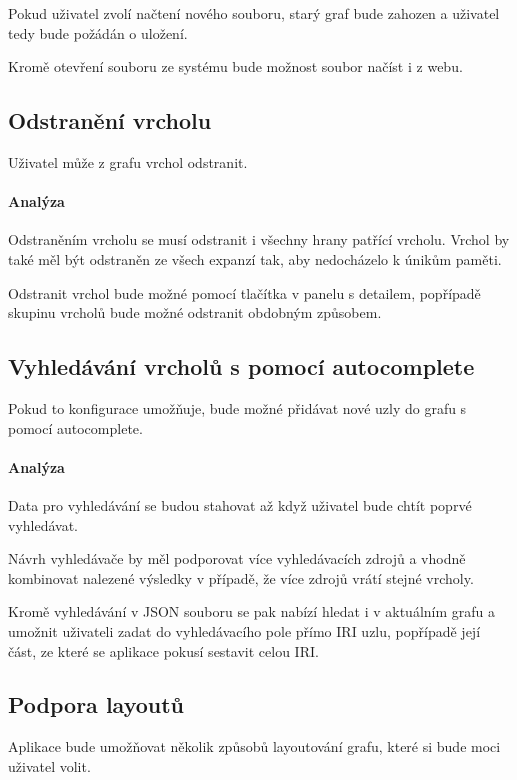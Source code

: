 Pokud uživatel zvolí načtení nového souboru, starý graf bude zahozen a uživatel tedy bude požádán o uložení.

Kromě otevření souboru ze systému bude možnost soubor načíst i z webu.

\subsection*{Odstranění vrcholu}
Uživatel může z grafu vrchol odstranit.

\paragraph{Analýza} Odstraněním vrcholu se musí odstranit i všechny hrany patřící vrcholu. Vrchol by také měl být odstraněn ze všech expanzí tak, aby nedocházelo k únikům paměti.

Odstranit vrchol bude možné pomocí tlačítka v panelu s detailem, popřípadě skupinu vrcholů bude možné odstranit obdobným způsobem.

\subsection*{Vyhledávání vrcholů s pomocí autocomplete}
Pokud to konfigurace umožňuje, bude možné přidávat nové uzly do grafu s pomocí autocomplete.

\paragraph{Analýza} Data pro vyhledávání se budou stahovat až když uživatel bude chtít poprvé vyhledávat.

Návrh vyhledávače by měl podporovat více vyhledávacích zdrojů a vhodně kombinovat nalezené výsledky v případě, že více zdrojů vrátí stejné vrcholy.

Kromě vyhledávání v JSON souboru se pak nabízí hledat i v aktuálním grafu a umožnit uživateli zadat do vyhledávacího pole přímo IRI uzlu, popřípadě její část, ze které se aplikace pokusí sestavit celou IRI.

\subsection*{Podpora layoutů}
Aplikace bude umožňovat několik způsobů layoutování grafu, které si bude moci uživatel volit.

